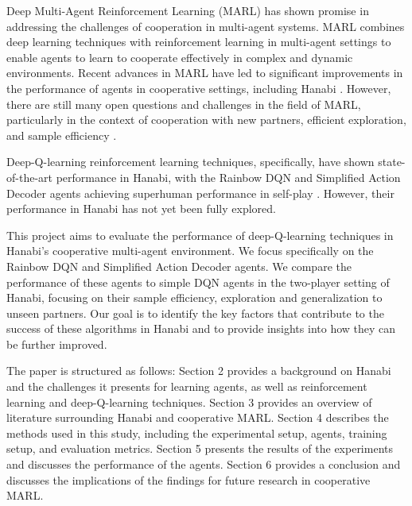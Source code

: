 Deep Multi-Agent Reinforcement Learning (MARL) has shown promise in addressing the challenges of cooperation in multi-agent systems. MARL combines deep learning techniques with reinforcement learning in multi-agent settings to enable agents to learn to cooperate effectively in complex and dynamic environments. Recent advances in MARL have led to significant improvements in the performance of agents in cooperative settings, including Hanabi \cite{huOtherPlayZeroShotCoordination, foersterBayesianActionDecoder2019}. However, there are still many open questions and challenges in the field of MARL, particularly in the context of cooperation with new partners, efficient exploration, and sample efficiency \cite{dafoeOpenProblemsCooperative2020, canaanDiverseAgentsAdHoc2019, bardHanabiChallengeNew2020a}.

Deep-Q-learning reinforcement learning techniques, specifically, have shown state-of-the-art performance in Hanabi, with the Rainbow DQN and Simplified Action Decoder agents achieving superhuman performance in self-play \cite{huSimplifiedActionDecoder2021, bardHanabiChallengeNew2020a}. However, their performance in Hanabi has not yet been fully explored. 

This project aims to evaluate the performance of deep-Q-learning techniques in Hanabi's cooperative multi-agent environment. We focus specifically on the Rainbow DQN and Simplified Action Decoder agents. We compare the performance of these agents to simple DQN agents in the two-player setting of Hanabi, focusing on their sample efficiency, exploration and generalization to unseen partners. Our goal is to identify the key factors that contribute to the success of these algorithms in Hanabi and to provide insights into how they can be further improved.

The paper is structured as follows: Section 2 provides a background on Hanabi and the challenges it presents for learning agents, as well as reinforcement learning and deep-Q-learning techniques. Section 3 provides an overview of literature surrounding Hanabi and cooperative MARL. Section 4 describes the methods used in this study, including the experimental setup, agents, training setup, and evaluation metrics. Section 5 presents the results of the experiments and discusses the performance of the agents. Section 6 provides a conclusion and discusses the implications of the findings for future research in cooperative MARL.